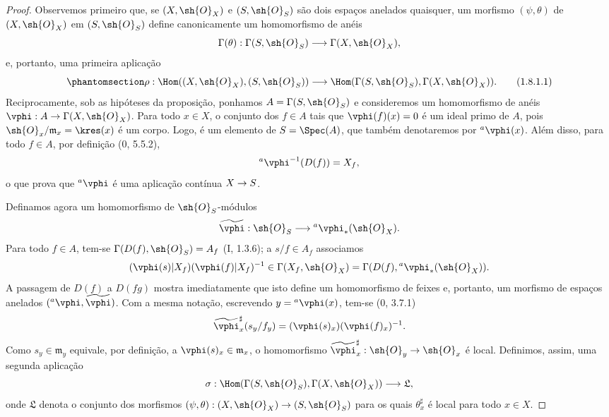 \documentclass[oneside,10pt]{amsart}
\makeatletter
\newcommand{\ega@arrow}[2]{\mathchoice{#1}{#2}{#2}{#2}}
\renewcommand{\to}{\ega@arrow{\longrightarrow}{\rightarrow}}
\let\EGAOriginalLabel\label
\renewcommand{\label}[1]{\phantomsection\EGAOriginalLabel{#1}}
\makeatother
\begin{document}
\begin{proof}
Observemos primeiro que, se $(X,\sh{O}_X)$ e $(S,\sh{O}_S)$ são dois
espaços anelados quaisquer, um morfismo $(\psi,\theta)$ de
$(X,\sh{O}_X)$ em $(S,\sh{O}_S)$ define canonicamente um homomorfismo
de anéis
\[
  \Gamma(\theta):\Gamma(S,\sh{O}_S)\to\Gamma(X,\sh{O}_X),
\]
e, portanto, uma primeira aplicação
\begin{equation}
\label{ega2:addendum:I.1.8.1.1}
  \rho:\Hom((X,\sh{O}_X),(S,\sh{O}_S))
  \to\Hom(\Gamma(S,\sh{O}_S),\Gamma(X,\sh{O}_X)).
\tag{1.8.1.1}
\end{equation}
Reciprocamente, sob as hipóteses da proposição, ponhamos
$A=\Gamma(S,\sh{O}_S)$ e consideremos um homomorfismo de anéis
$\vphi:A\to\Gamma(X,\sh{O}_X)$. Para todo $x\in X$, o conjunto dos
$f\in A$ tais que $\vphi(f)(x)=0$ é um ideal primo de $A$, pois
$\sh{O}_x/\mathfrak{m}_x=\kres(x)$ é um corpo. Logo, é um elemento de
$S=\Spec(A)$, que também denotaremos por ${}^a\vphi(x)$. Além disso,
para todo $f\in A$, por definição (0, 5.5.2),
\[
  {}^a\vphi^{-1}(D(f))=X_f,
\]
o que prova que ${}^a\vphi$ é uma aplicação contínua $X\to S$.

Definamos agora um homomorfismo de $\sh{O}_S$-módulos
\[
  \widetilde{\vphi}:\sh{O}_S\to{}^a\vphi_*(\sh{O}_X).
\]
Para todo $f\in A$, tem-se
$\Gamma(D(f),\sh{O}_S)=A_f$ (I, 1.3.6); a $s/f\in A_f$ associamos
\[
  (\vphi(s)|X_f)(\vphi(f)|X_f)^{-1}
  \in\Gamma(X_f,\sh{O}_X)
  =\Gamma(D(f),{}^a\vphi_*(\sh{O}_X)).
\]
A passagem de $D(f)$ a $D(fg)$ mostra imediatamente que isto define
um homomorfismo de feixes e, portanto, um morfismo de espaços anelados
$({}^a\vphi,\widetilde{\vphi})$. Com a mesma notação, escrevendo
$y={}^a\vphi(x)$, tem-se (0, 3.7.1)
\[
  \widetilde{\vphi}_x^\sharp(s_y/f_y)
  =(\vphi(s)_x)(\vphi(f)_x)^{-1}.
\]
Como $s_y\in\mathfrak{m}_y$ equivale, por definição, a
$\vphi(s)_x\in\mathfrak{m}_x$, o homomorfismo
$\widetilde{\vphi}_x^\sharp:\sh{O}_y\to\sh{O}_x$ é local. Definimos,
assim, uma segunda aplicação
\[
  \sigma:\Hom(\Gamma(S,\sh{O}_S),\Gamma(X,\sh{O}_X))
  \to\mathfrak{L},
\]
onde $\mathfrak{L}$ denota o conjunto dos morfismos
$(\psi,\theta):(X,\sh{O}_X)\to(S,\sh{O}_S)$ para os quais
$\theta_x^\sharp$ é local para todo $x\in X$.


\end{proof}
\end{document}
